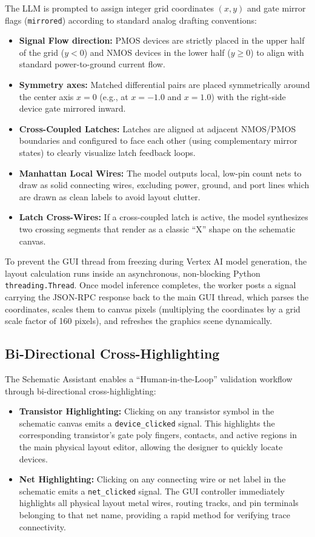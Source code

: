 \noindent
The LLM is prompted to assign integer grid coordinates $(x, y)$ and gate mirror flags (\texttt{mirrored}) according to standard analog drafting conventions:
\begin{itemize}
    \item \textbf{Signal Flow direction:} PMOS devices are strictly placed in the upper half of the grid ($y < 0$) and NMOS devices in the lower half ($y \geq 0$) to align with standard power-to-ground current flow.
    \item \textbf{Symmetry axes:} Matched differential pairs are placed symmetrically around the center axis $x = 0$ (e.g., at $x = -1.0$ and $x = 1.0$) with the right-side device gate mirrored inward.
    \item \textbf{Cross-Coupled Latches:} Latches are aligned at adjacent NMOS/PMOS boundaries and configured to face each other (using complementary mirror states) to clearly visualize latch feedback loops.
    \item \textbf{Manhattan Local Wires:} The model outputs local, low-pin count nets to draw as solid connecting wires, excluding power, ground, and port lines which are drawn as clean labels to avoid layout clutter.
    \item \textbf{Latch Cross-Wires:} If a cross-coupled latch is active, the model synthesizes two crossing segments that render as a classic ``X'' shape on the schematic canvas.
\end{itemize}

\noindent
To prevent the GUI thread from freezing during Vertex AI model generation, the layout calculation runs inside an asynchronous, non-blocking Python \texttt{threading.Thread}. Once model inference completes, the worker posts a signal carrying the JSON-RPC response back to the main GUI thread, which parses the coordinates, scales them to canvas pixels (multiplying the coordinates by a grid scale factor of 160 pixels), and refreshes the graphics scene dynamically.

\subsection{Bi-Directional Cross-Highlighting}
\noindent
The Schematic Assistant enables a ``Human-in-the-Loop'' validation workflow through bi-directional cross-highlighting:
\begin{itemize}
    \item \textbf{Transistor Highlighting:} Clicking on any transistor symbol in the schematic canvas emits a \texttt{device\_clicked} signal. This highlights the corresponding transistor's gate poly fingers, contacts, and active regions in the main physical layout editor, allowing the designer to quickly locate devices.
    \item \textbf{Net Highlighting:} Clicking on any connecting wire or net label in the schematic emits a \texttt{net\_clicked} signal. The GUI controller immediately highlights all physical layout metal wires, routing tracks, and pin terminals belonging to that net name, providing a rapid method for verifying trace connectivity.
\end{itemize}

